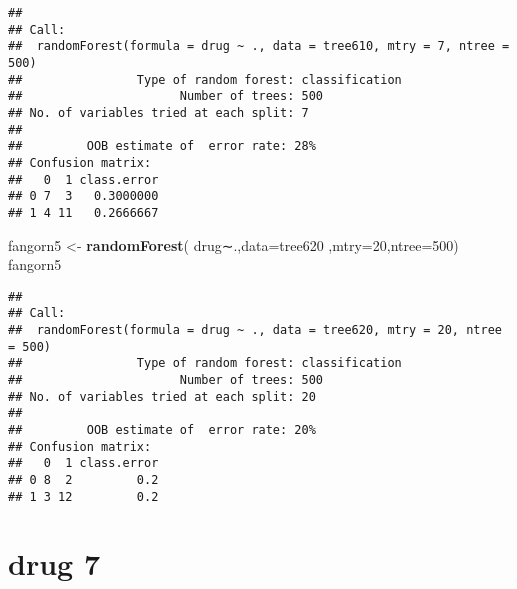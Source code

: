 \documentclass[]{article}
\newenvironment{Shaded}{\begin{snugshade}}{\end{snugshade}}
\newcommand{\KeywordTok}[1]{\textcolor[rgb]{0.13,0.29,0.53}{\textbf{#1}}}
\newcommand{\DataTypeTok}[1]{\textcolor[rgb]{0.13,0.29,0.53}{#1}}
\newcommand{\DecValTok}[1]{\textcolor[rgb]{0.00,0.00,0.81}{#1}}
\newcommand{\StringTok}[1]{\textcolor[rgb]{0.31,0.60,0.02}{#1}}
\newcommand{\CommentTok}[1]{\textcolor[rgb]{0.56,0.35,0.01}{\textit{#1}}}
\newcommand{\OperatorTok}[1]{\textcolor[rgb]{0.81,0.36,0.00}{\textbf{#1}}}
\newcommand{\NormalTok}[1]{#1}
\begin{document}
\begin{verbatim}
## 
## Call:
##  randomForest(formula = drug ~ ., data = tree610, mtry = 7, ntree = 500) 
##                Type of random forest: classification
##                      Number of trees: 500
## No. of variables tried at each split: 7
## 
##         OOB estimate of  error rate: 28%
## Confusion matrix:
##   0  1 class.error
## 0 7  3   0.3000000
## 1 4 11   0.2666667
\end{verbatim}

\begin{Shaded}
\begin{Highlighting}[]
\NormalTok{fangorn5 <-}\StringTok{ }\KeywordTok{randomForest}\NormalTok{( drug∼.,}\DataTypeTok{data=}\NormalTok{tree620  ,}\DataTypeTok{mtry=}\DecValTok{20}\NormalTok{,}\DataTypeTok{ntree=}\DecValTok{500}\NormalTok{)}
\NormalTok{fangorn5}
\end{Highlighting}
\end{Shaded}

\begin{verbatim}
## 
## Call:
##  randomForest(formula = drug ~ ., data = tree620, mtry = 20, ntree = 500) 
##                Type of random forest: classification
##                      Number of trees: 500
## No. of variables tried at each split: 20
## 
##         OOB estimate of  error rate: 20%
## Confusion matrix:
##   0  1 class.error
## 0 8  2         0.2
## 1 3 12         0.2
\end{verbatim}

\section{drug 7}\label{drug-7}

\begin{Shaded}
\end{Shaded}
\end{document}
